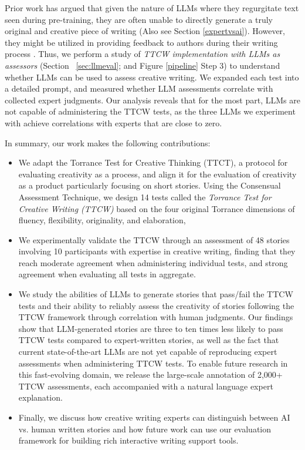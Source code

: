 Prior work \cite{ippolito2022creative} has argued that given the nature of LLMs where they regurgitate text seen during pre-training, they are often unable to directly generate a truly original and creative piece of writing (Also see Section \ref{expertvsai}). However, they might be utilized in providing feedback to authors during their writing process \cite{chakrabarty2023creativity}. Thus, we perform a study of \textit{TTCW implementation with LLMs as assessors} (Section ~\ref{sec:llmeval}; and Figure \ref{pipeline} Step 3) %
to understand whether LLMs can be used to assess creative writing. 
We expanded each test into a detailed prompt, and measured whether LLM assessments correlate with collected expert judgments. Our analysis reveals that for the most part, LLMs are not capable of administering the TTCW tests, as the three LLMs we experiment with achieve correlations with experts that are close to zero.

In summary, our work makes the following contributions:
\begin{itemize}
    \item We adapt the Torrance Test for Creative Thinking (TTCT), a protocol for evaluating creativity as a process, and align it for the evaluation of creativity as a product particularly focusing on short stories. Using the Consensual Assessment Technique, we design 14 tests called the \textit{Torrance Test for Creative Writing (TTCW)} based on the four original Torrance dimensions of fluency, flexibility, originality, and elaboration,
    \item We experimentally validate the TTCW through an assessment of 48 stories involving 10 participants with expertise in creative writing, finding that they reach moderate agreement when administering individual tests, and strong agreement when evaluating all tests in aggregate.
    \item We study the abilities of LLMs to generate stories that pass/fail the TTCW tests and their ability to reliably assess the creativity of stories following the TTCW framework through correlation with human judgments. Our findings show that LLM-generated stories are three to ten times less likely to pass TTCW tests compared to expert-written stories, as well as the fact that current state-of-the-art LLMs are not yet capable of reproducing expert assessments when administering TTCW tests. To enable future research in this fast-evolving domain, we release the large-scale annotation of 2,000+ TTCW assessments, each accompanied with a natural language expert explanation. 
    \item Finally, we discuss how creative writing experts can distinguish between AI vs. human written stories and how future work can use our evaluation framework for building rich interactive writing support tools.
\end{itemize}
